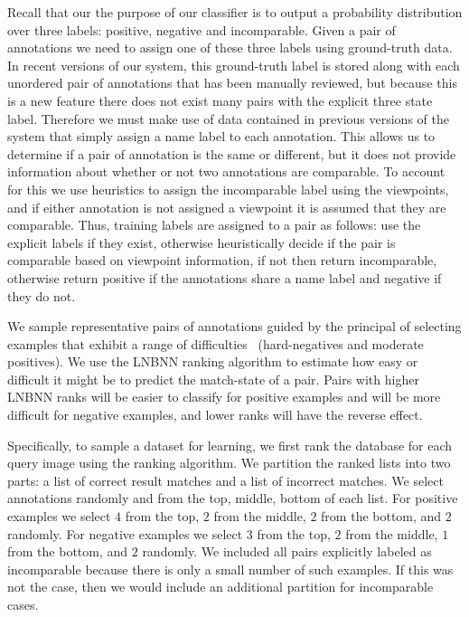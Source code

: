 Recall that our the purpose of our classifier is to output a probability distribution over three labels:
positive, negative and incomparable.
Given a pair of annotations we need to assign one of these three labels using ground-truth data.
In recent versions of our system, this ground-truth label is stored along with each unordered pair of annotations
  that has been manually reviewed, but because this is a new feature there does not exist many pairs with the
  explicit three state label.
Therefore we must make use of data contained in previous versions of the system that simply assign a name label
  to each annotation.
This allows us to determine if a pair of annotation is the same or different, but it does not provide information
  about whether or not two annotations are comparable.
To account for this we use heuristics to assign the incomparable label using the viewpoints, and if either
  annotation is not assigned a viewpoint it is assumed that they are comparable.
Thus, training labels are assigned to a pair as follows:
use the explicit labels if they exist, otherwise heuristically decide if the pair is comparable based on
  viewpoint information, if not then return incomparable, otherwise return positive if the annotations share a name
  label and negative if they do not.

We sample representative pairs of annotations guided by the principal of selecting examples that exhibit a range
  of difficulties~\cite{shi_embedding_2016} (\eg hard-negatives and moderate positives).
We use the LNBNN ranking algorithm to estimate how easy or difficult it might be to predict the match-state of a
  pair.
Pairs with higher LNBNN ranks will be easier to classify for positive examples and will be more difficult for
  negative examples, and lower ranks will have the reverse effect.

Specifically, to sample a dataset for learning, we first rank the database for each query image using the ranking
  algorithm.
We partition the ranked lists into two parts:
a list of correct result matches and a list of incorrect matches.
We select annotations randomly and from the top, middle, bottom of each list.
For positive examples we select $4$ from the top, $2$ from the middle, $2$ from the bottom, and $2$ randomly.
For negative examples we select $3$ from the top, $2$ from the middle, $1$ from the bottom, and $2$ randomly.
We included all pairs explicitly labeled as incomparable because there is only a small number of such examples.
If this was not the case, then we would include an additional partition for incomparable cases.


